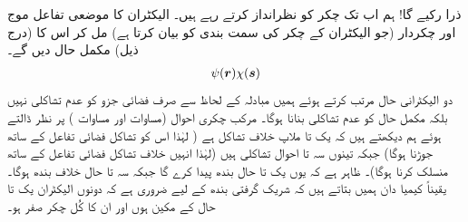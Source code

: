 ذرا رکیے گا! ہم اب تک چکر کو نظرانداز کرتے رہے ہیں۔ الیکٹران کا موضعی تفاعل موج اور چکردار (جو الیکٹران کے چکر کی سمت بندی کو بیان کرتا ہے) مل کر اس کا (درج ذیل) مکمل حال دیں گے۔
\begin{align}
	\psi({{\boldsymbol{r}}})\chi({{\boldsymbol{s}}})
\end{align}
دو الیکٹرانی حال مرتب کرتے ہوئے ہمیں مبادلہ کے لحاظ سے صرف فضائی جزو کو عدم تشاکلی نہیں بلکہ مکمل حال کو عدم تشاکلی بنانا ہوگا۔ مرکب چکری احوال (مساوات  اور مساوات ) پر نظر ڈالتے ہوئے ہم دیکھتے ہیں کہ یک تا ملاپ خلاف تشاکل ہے ( لہٰذا اس کو تشاکل فضائی تفاعل کے ساتھ جوڑنا ہوگا) جبکہ تینوں سہ تا احوال تشاکلی ہیں (لہٰذا انہیں خلاف تشاکل فضائی تفاعل کے ساتھ منسلک کرنا ہوگا)۔ ظاہر ہے کہ یوں یک تا حال بندھ پیدا کرے گا جبکہ سہ تا حال خلاف بندھ ہوگا۔ یقیناً کیمیا دان ہمیں بتاتے ہیں کہ شریک گرفتی بندھ کے لیے ضروری ہے کہ دونوں الیکٹران یک تا حال کے مکین ہوں اور ان کا کُل چکر صفر ہو۔


